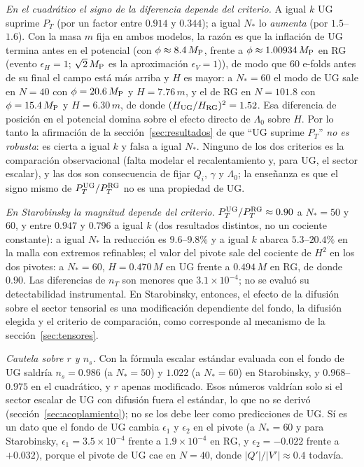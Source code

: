 \emph{En el cuadrático el signo de la diferencia depende del criterio.} A igual $k$ UG suprime $P_T$ (por un factor entre $0.914$ y $0.344$); a igual $N_*$ lo \emph{aumenta} (por $1.5$--$1.6$). Con la masa $m$ fija en ambos modelos, la razón es que la inflación de UG termina antes en el potencial (con $\phi\approx8.4\,M_{\rm P}$, frente a $\phi\approx1.00934\,M_{\rm P}$ en RG (evento $\epsilon_H=1$; $\sqrt2\,M_{\rm P}$ es la aproximación $\epsilon_V=1$)), de modo que 60 e-folds antes de su final el campo está más arriba y $H$ es mayor: a $N_*=60$ el modo de UG sale en $N=40$ con $\phi=20.6\,M_{\rm P}$ y $H=7.76\,m$, y el de RG en $N=101.8$ con $\phi=15.4\,M_{\rm P}$ y $H=6.30\,m$, de donde $(H_{\rm UG}/H_{\rm RG})^2=1.52$. Esa diferencia de posición en el potencial domina sobre el efecto directo de $\Lambda_0$ sobre $H$. Por lo tanto la afirmación de la sección~\ref{sec:resultados} de que ``UG suprime $P_T$'' \emph{no es robusta}: es cierta a igual $k$ y falsa a igual $N_*$. Ninguno de los dos criterios es la comparación observacional (falta modelar el recalentamiento y, para UG, el sector escalar), y las dos son consecuencia de fijar $Q_i$, $\gamma$ y $\Lambda_0$; la enseñanza es que el signo mismo de $P_T^{\rm UG}/P_T^{\rm RG}$ no es una propiedad de UG.

\emph{En Starobinsky la magnitud depende del criterio.} $P_T^{\rm UG}/P_T^{\rm RG}\approx0.90$ a $N_*=50$ y $60$, y entre $0.947$ y $0.796$ a igual $k$ (dos resultados distintos, no un cociente constante): a igual $N_*$ la reducción es $9.6$--$9.8\%$ y a igual $k$ abarca $5.3$--$20.4\%$ en la malla con extremos refinables; el valor del pivote sale del cociente de $H^2$ en los dos pivotes: a $N_*=60$, $H=0.470\,M$ en UG frente a $0.494\,M$ en RG, de donde $0.90$. Las diferencias de $n_T$ son menores que $3.1\times10^{-4}$; no se evaluó su detectabilidad instrumental. En Starobinsky, entonces, el efecto de la difusión sobre el sector tensorial es una modificación dependiente del fondo, la difusión elegida y el criterio de comparación, como corresponde al mecanismo de la sección~\ref{sec:tensores}.

\emph{Cautela sobre $r$ y $n_s$.} Con la fórmula escalar estándar evaluada con el fondo de UG saldría $n_s=0.986$ (a $N_*=50$) y $1.022$ (a $N_*=60$) en Starobinsky, y $0.968$--$0.975$ en el cuadrático, y $r$ apenas modificado. Esos números valdrían solo si el sector escalar de UG con difusión fuera el estándar, lo que no se derivó (sección~\ref{sec:acoplamiento}); no se los debe leer como predicciones de UG. Sí es un dato que el fondo de UG cambia $\epsilon_1$ y $\epsilon_2$ en el pivote (a $N_*=60$ y para Starobinsky, $\epsilon_1=3.5\times10^{-4}$ frente a $1.9\times10^{-4}$ en RG, y $\epsilon_2=-0.022$ frente a $+0.032$), porque el pivote de UG cae en $N=40$, donde $|Q'|/|V'|\approx0.4$ todavía.

